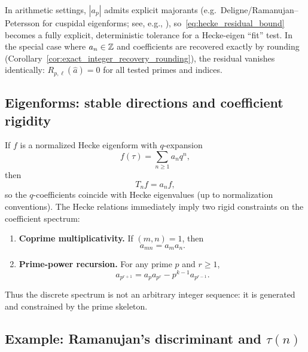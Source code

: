 \begin{remark}
In arithmetic settings, $|a_p|$ admits explicit majorants (e.g.\ Deligne/Ramanujan--Petersson for cuspidal eigenforms; see, e.g., \cite{Deligne1974,Serre1973,DiamondShurman2005}), so~\eqref{eq:hecke_residual_bound} becomes a fully explicit, deterministic tolerance for a Hecke-eigen ``fit'' test.
In the special case where $a_n\in\mathbb{Z}$ and coefficients are recovered exactly by rounding (Corollary~\ref{cor:exact_integer_recovery_rounding}), the residual vanishes identically: $R_{p,\ell}(\widehat a)=0$ for all tested primes and indices.
\end{remark}

\subsection{Eigenforms: stable directions and coefficient rigidity}
\label{sec:eigenforms_coeff_rigidity}

If $f$ is a normalized Hecke eigenform with $q$-expansion
\begin{equation}
f(\tau)=\sum_{n\ge 1} a_n q^n,
\end{equation}
then
\begin{equation}
T_n f = a_n f,
\end{equation}
so the $q$-coefficients coincide with Hecke eigenvalues (up to normalization conventions). The Hecke relations immediately imply two rigid constraints on the coefficient spectrum:
\begin{enumerate}
\item \textbf{Coprime multiplicativity.} If $(m,n)=1$, then
\begin{equation}
a_{mn}=a_m a_n.
\end{equation}
\item \textbf{Prime-power recursion.} For any prime $p$ and $r\ge 1$,
\begin{equation}
a_{p^{r+1}} = a_p a_{p^r} - p^{k-1} a_{p^{r-1}}.
\end{equation}
\end{enumerate}
Thus the discrete spectrum is not an arbitrary integer sequence: it is generated and constrained by the prime skeleton.

\subsection{Example: Ramanujan's discriminant and \texorpdfstring{$\tau(n)$}{tau(n)}}
\label{sec:ramanujan_tau_example}

